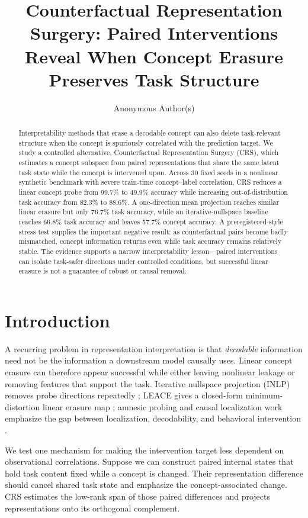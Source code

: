 \documentclass{article}
\title{Counterfactual Representation Surgery: Paired Interventions Reveal When Concept Erasure Preserves Task Structure}
\author{Anonymous Author(s)}
\begin{document}
\maketitle

\begin{abstract}
Interpretability methods that erase a decodable concept can also delete task-relevant structure when the concept is spuriously correlated with the prediction target. We study a controlled alternative, Counterfactual Representation Surgery (CRS), which estimates a concept subspace from paired representations that share the same latent task state while the concept is intervened upon. Across 30 fixed seeds in a nonlinear synthetic benchmark with severe train-time concept--label correlation, CRS reduces a linear concept probe from 99.7\% to 49.9\% accuracy while increasing out-of-distribution task accuracy from 82.3\% to 88.6\%. A one-direction mean projection reaches similar linear erasure but only 76.7\% task accuracy, while an iterative-nullspace baseline reaches 66.8\% task accuracy and leaves 57.7\% concept accuracy. A preregistered-style stress test supplies the important negative result: as counterfactual pairs become badly mismatched, concept information returns even while task accuracy remains relatively stable. The evidence supports a narrow interpretability lesson---paired interventions can isolate task-safer directions under controlled conditions, but successful linear erasure is not a guarantee of robust or causal removal.
\end{abstract}

\section{Introduction}
A recurring problem in representation interpretation is that \emph{decodable} information need not be the information a downstream model causally uses. Linear concept erasure can therefore appear successful while either leaving nonlinear leakage or removing features that support the task. Iterative nullspace projection (INLP) removes probe directions repeatedly \cite{ravfogel2020}; LEACE gives a closed-form minimum-distortion linear erasure map \cite{belrose2023}; amnesic probing and causal localization work emphasize the gap between localization, decodability, and behavioral intervention \cite{elazar2021,hase2023,meng2022}.

We test one mechanism for making the intervention target less dependent on observational correlations. Suppose we can construct paired internal states that hold task content fixed while a concept is changed. Their representation difference should cancel shared task state and emphasize the concept-associated change. CRS estimates the low-rank span of those paired differences and projects representations onto its orthogonal complement.
\end{document}
